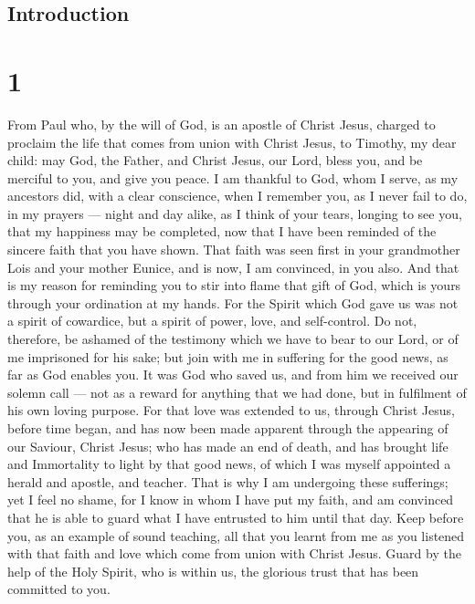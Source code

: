\hypertarget{introduction}{%
\subsection{Introduction}\label{introduction}}

\hypertarget{section}{%
\section{1}\label{section}}

 From Paul who, by the will of God, is an apostle of Christ
Jesus, charged to proclaim the life that comes from union with Christ
Jesus,  to Timothy, my dear child: may God, the Father, and
Christ Jesus, our Lord, bless you, and be merciful to you, and give you
peace.  I am thankful to God, whom I serve, as my ancestors
did, with a clear conscience, when I remember you, as I never fail to
do, in my prayers --- night and day alike,  as I think of
your tears, longing to see you, that my happiness may be completed,
 now that I have been reminded of the sincere faith that you
have shown. That faith was seen first in your grandmother Lois and your
mother Eunice, and is now, I am convinced, in you also.  And
that is my reason for reminding you to stir into flame that gift of God,
which is yours through your ordination at my hands.  For the
Spirit which God gave us was not a spirit of cowardice, but a spirit of
power, love, and self-control.  Do not, therefore, be
ashamed of the testimony which we have to bear to our Lord, or of me
imprisoned for his sake; but join with me in suffering for the good
news, as far as God enables you.  It was God who saved us,
and from him we received our solemn call --- not as a reward for
anything that we had done, but in fulfilment of his own loving purpose.
For that love was extended to us, through Christ Jesus, before time
began,  and has now been made apparent through the
appearing of our Saviour, Christ Jesus; who has made an end of death,
and has brought life and Immortality to light by that good news,
 of which I was myself appointed a herald and apostle, and
teacher.  That is why I am undergoing these sufferings; yet
I feel no shame, for I know in whom I have put my faith, and am
convinced that he is able to guard what I have entrusted to him until
that day.  Keep before you, as an example of sound
teaching, all that you learnt from me as you listened with that faith
and love which come from union with Christ Jesus.  Guard by
the help of the Holy Spirit, who is within us, the glorious trust that
has been committed to you.

